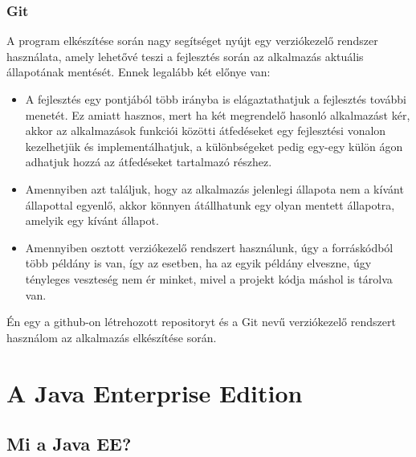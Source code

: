 \documentclass[centeredchapter]{thesis-ekf}
\theoremstyle{definition}
\theoremstyle{remark}
\begin{document}
\subsection{Git}

A program elkészítése során nagy segítséget nyújt egy verziókezelő rendszer használata, amely lehetővé teszi a fejlesztés során az alkalmazás aktuális állapotának mentését. Ennek legalább két előnye van:
\begin{itemize}
	\item A fejlesztés egy pontjából több irányba is elágaztathatjuk a fejlesztés további menetét. Ez amiatt hasznos, mert ha két megrendelő hasonló alkalmazást kér, akkor az alkalmazások funkciói közötti átfedéseket egy fejlesztési vonalon kezelhetjük és implementálhatjuk, a különbségeket pedig egy-egy külön ágon adhatjuk hozzá az átfedéseket tartalmazó részhez.
	\item Amennyiben azt találjuk, hogy az alkalmazás jelenlegi állapota nem a kívánt állapottal egyenlő, akkor könnyen átállhatunk egy olyan mentett állapotra, amelyik egy kívánt állapot.
	\item  Amennyiben osztott verziókezelő rendszert használunk, úgy a forráskódból több példány is van, így az esetben, ha az egyik példány elveszne, úgy tényleges veszteség nem ér minket, mivel a projekt kódja máshol is tárolva van.
\end{itemize}

Én egy a github-on létrehozott repositoryt és a Git nevű verziókezelő rendszert használom az alkalmazás elkészítése során.


\chapter{A Java Enterprise Edition}

\section{Mi a Java EE?}
\end{document}
